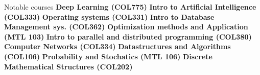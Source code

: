 \begin{rubric}{Notable courses}
    \entry*
    \textbf{Deep Learning (COL775)}
    \entry*
    \textbf{Intro to Artificial Intelligence (COL333)}
    \entry*
    \textbf{Operating systems (COL331)}
    \entry*
    \textbf{Intro to Database Management sys. (COL362)}
    \entry*
    \textbf{Optimization methods and Application (MTL 103)}
    \entry*
    \textbf{Intro to parallel and distributed programming (COL380)}
    \entry*
    \textbf{Computer Networks (COL334)}
    \entry*
    \textbf{Datastructures and Algorithms (COL106)}
    \entry*
    \textbf{Probability and Stochatics (MTL 106)}
    \entry*
    \textbf{Discrete Mathematical Structures (COL202)}
\end{rubric}